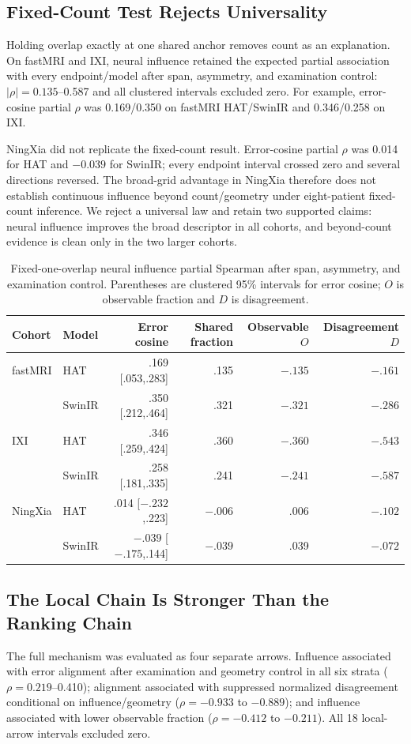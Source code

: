 \documentclass[10pt,twocolumn,letterpaper]{article}
\begin{document}
\subsection{Fixed-Count Test Rejects Universality}
Holding overlap exactly at one shared anchor removes count as an explanation. On fastMRI and IXI, neural influence retained the expected partial association with every endpoint/model after span, asymmetry, and examination control: $|\rho|=0.135$--0.587 and all clustered intervals excluded zero. For example, error-cosine partial $\rho$ was 0.169/0.350 on fastMRI HAT/SwinIR and 0.346/0.258 on IXI.

NingXia did not replicate the fixed-count result. Error-cosine partial $\rho$ was 0.014 for HAT and $-0.039$ for SwinIR; every endpoint interval crossed zero and several directions reversed. The broad-grid advantage in NingXia therefore does not establish continuous influence beyond count/geometry under eight-patient fixed-count inference. We reject a universal law and retain two supported claims: neural influence improves the broad descriptor in all cohorts, and beyond-count evidence is clean only in the two larger cohorts.

\begin{table}[t]
\centering
\caption{Fixed-one-overlap neural influence partial Spearman after span, asymmetry, and examination control. Parentheses are clustered 95\% intervals for error cosine; $O$ is observable fraction and $D$ is disagreement.}
\label{tab:fixed}
\setlength{\tabcolsep}{4pt}
\begin{tabular}{llrrrr}
\toprule
Cohort&Model&Error cosine&Shared fraction&Observable $O$&Disagreement $D$\\
\midrule
fastMRI&HAT&.169 [.053,.283]&.135&$-.135$&$-.161$\\
&SwinIR&.350 [.212,.464]&.321&$-.321$&$-.286$\\
IXI&HAT&.346 [.259,.424]&.360&$-.360$&$-.543$\\
&SwinIR&.258 [.181,.335]&.241&$-.241$&$-.587$\\
NingXia&HAT&.014 [$-.232$,.223]&$-.006$&.006&$-.102$\\
&SwinIR&$-.039$ [$-.175$,.144]&$-.039$&.039&$-.072$\\
\bottomrule
\end{tabular}
\end{table}

\subsection{The Local Chain Is Stronger Than the Ranking Chain}
The full mechanism was evaluated as four separate arrows. Influence associated with error alignment after examination and geometry control in all six strata ($\rho=0.219$--0.410); alignment associated with suppressed normalized disagreement conditional on influence/geometry ($\rho=-0.933$ to $-0.889$); and influence associated with lower observable fraction ($\rho=-0.412$ to $-0.211$). All 18 local-arrow intervals excluded zero.
\end{document}
